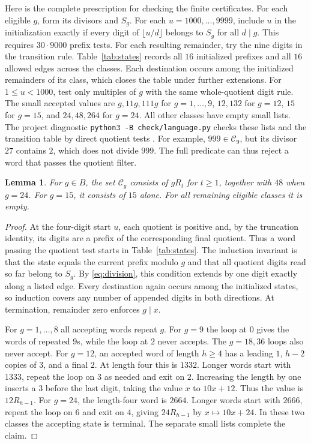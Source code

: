 \documentclass[11pt]{article}
\newtheorem{lemma}[theorem]{Lemma}
\begin{document}
Here is the complete prescription for checking the finite certificates.
For each eligible \(g\), form its divisors and \(S_g\). For each
\(u=1000,\ldots,9999\), include \(u\) in the initialization exactly if
every digit of \(\lfloor u/d\rfloor\) belongs to \(S_g\) for all
\(d\mid g\). This requires \(30\cdot9000\) prefix tests. For each
resulting remainder, try the nine digits in the transition rule.
Table~\ref{tab:states} records all \(16\) initialized prefixes and
all \(16\) allowed edges across the classes. Each destination occurs
among the initialized remainders of its class, which closes the table
under further extensions. For \(1\le u<1000\), test only multiples
of \(g\) with the same whole-quotient digit rule. The small accepted
values are \(g,11g,111g\) for \(g=1,\ldots,9\), \(12,132\) for
\(g=12\), \(15\) for \(g=15\), and \(24,48,264\) for \(g=24\). All
other classes have empty small lists. The project diagnostic
\verb|python3 -B check/language.py| checks these lists and the
transition table by direct quotient tests \cite{project}. For
example, \(999\in\mathcal C_9\), but its divisor \(27\) contains \(2\),
which does not divide \(999\). The full predicate can thus reject a
word that passes the quotient filter.

\begin{lemma}\label{lem:language}
For \(g\in B\), the set \(\mathcal C_g\) consists of \(gR_t\) for
\(t\ge1\), together with \(48\) when \(g=24\).
For \(g=15\), it consists of \(15\) alone.
For all remaining eligible classes it is empty.
\end{lemma}

\begin{proof}
At the four-digit start \(u\), each quotient is positive and, by the
truncation identity, its digits are a prefix of the corresponding
final quotient. Thus a word passing the quotient test starts in
Table~\ref{tab:states}. The induction invariant is that the state
equals the current prefix modulo \(g\) and that all quotient digits
read so far belong to \(S_g\). By \eqref{eq:division}, this condition
extends by one digit exactly along a listed edge. Every destination
again occurs among the initialized states, so induction covers any
number of appended digits in both directions. At termination, remainder
zero enforces \(g\mid x\).

For \(g=1,\ldots,8\) all accepting words repeat \(g\). For \(g=9\) the
loop at \(0\) gives the words of repeated \(9\)s, while the loop at
\(2\) never accepts. The \(g=18,36\) loops also never accept. For
\(g=12\), an accepted word of length \(h\ge4\) has a leading \(1\),
\(h-2\) copies of \(3\), and a final \(2\). At length four this is
\(1332\). Longer words start with \(1333\), repeat the loop on \(3\)
as needed and exit on \(2\). Increasing the length by one inserts a
\(3\) before the last digit, taking the value \(x\) to \(10x+12\).
Thus the value is \(12R_{h-1}\). For \(g=24\), the length-four word
is \(2664\). Longer words start with \(2666\), repeat the loop on
\(6\) and exit on \(4\), giving \(24R_{h-1}\) by \(x\mapsto10x+24\).
In these two classes the accepting state is terminal. The separate
small lists complete the claim.
\end{proof}
\end{document}

